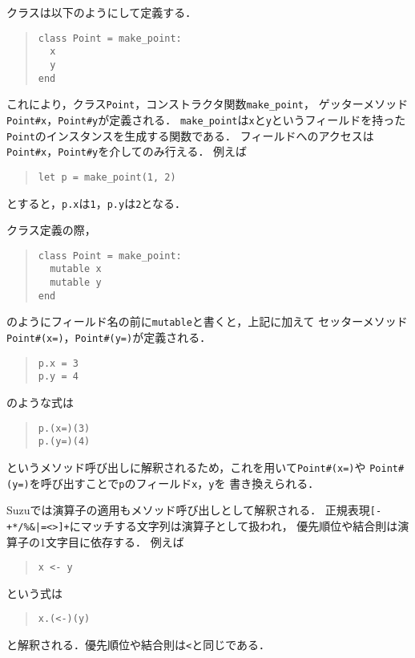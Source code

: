 \documentclass[a4paper,11pt,dvipdfmx]{jreport}
\begin{document}
クラスは以下のようにして定義する．
\begin{quote}
\begin{verbatim}
class Point = make_point:
  x
  y
end
\end{verbatim}
\end{quote}
これにより，クラス\verb|Point|，コンストラクタ関数\verb|make_point|，
ゲッターメソッド\verb|Point#x|，\verb|Point#y|が定義される．
\verb|make_point|は\verb|x|と\verb|y|というフィールドを持った
\verb|Point|のインスタンスを生成する関数である．
フィールドへのアクセスは\verb|Point#x|，\verb|Point#y|を介してのみ行える．
例えば
\begin{quote}
\begin{verbatim}
let p = make_point(1, 2)
\end{verbatim}
\end{quote}
とすると，\verb|p.x|は\verb|1|，\verb|p.y|は\verb|2|となる．

クラス定義の際，
\begin{quote}
\begin{verbatim}
class Point = make_point:
  mutable x
  mutable y
end
\end{verbatim}
\end{quote}
のようにフィールド名の前に\verb|mutable|と書くと，上記に加えて
セッターメソッド\verb|Point#(x=)|，\verb|Point#(y=)|が定義される．
\begin{quote}
\begin{verbatim}
p.x = 3
p.y = 4
\end{verbatim}
\end{quote}
のような式は
\begin{quote}
\begin{verbatim}
p.(x=)(3)
p.(y=)(4)
\end{verbatim}
\end{quote}
というメソッド呼び出しに解釈されるため，これを用いて\verb|Point#(x=)|や
\verb|Point#(y=)|を呼び出すことで\verb|p|のフィールド\verb|x|，\verb|y|を
書き換えられる．

Suzuでは演算子の適用もメソッド呼び出しとして解釈される．
正規表現\verb$[-+*/%&|=<>]+$にマッチする文字列は演算子として扱われ，
優先順位や結合則は演算子の1文字目に依存する．
例えば
\begin{quote}
\begin{verbatim}
x <- y
\end{verbatim}
\end{quote}
という式は
\begin{quote}
\begin{verbatim}
x.(<-)(y)
\end{verbatim}
\end{quote}
と解釈される．優先順位や結合則は\verb|<|と同じである．
\end{document}
